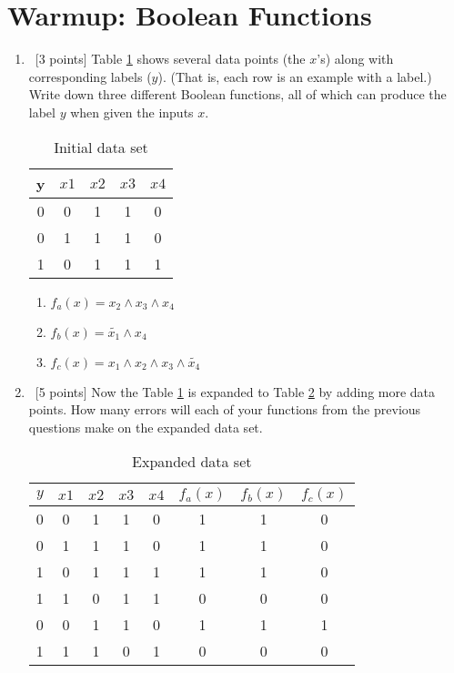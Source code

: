 \section{Warmup: Boolean Functions}
\label{sec:boolean-functions}

\begin{enumerate}
\item ~[3 points] Table \ref{tab:boolean-function-data-1} shows
  several data points (the $x$'s) along with corresponding labels
  ($y$). (That is, each row is an example with a label.) Write down
  three different Boolean functions, all of which can produce the
  label $y$ when given the inputs $x$.


  \begin{table}[h]
    \centering
    \begin{tabular}{|c|cccc|}
      \hline
      y & $x1$ & $x2$ & $x3$ & $x4$ \\
      \hline 
      0 & 0    & 1    & 1    & 0    \\
      0 & 1    & 1    & 1    & 0    \\
      1 & 0    & 1    & 1    & 1    \\
      \hline
    \end{tabular}
    \caption{Initial data set}
    \label{tab:boolean-function-data-1}
  \end{table}

  \begin{enumerate}
    \item $f_{a}(x) = x_{2} \wedge x_{3} \wedge x_{4}$
    \item $f_{b}(x) = \tilde{x_{1}} \wedge x_{4}$
    \item $f_{c}(x) = x_{1} \wedge x_{2} \wedge x_{3} \wedge \tilde{x_{4}}$
  \end{enumerate}
  
\item ~[5 points] Now the Table \ref{tab:boolean-function-data-1} is
  expanded to Table \ref{tab:boolean-function-data-2} by adding more
  data points. How many errors will each of your functions from the
  previous questions make on the expanded data set.

  \begin{table}[h]
    \centering
    \begin{tabular}{|c|cccc| ccc|}
      \hline
      $y$ & $x1$ & $x2$ & $x3$ & $x4$ & $f_{a}(x)$ & $f_{b}(x)$ & $f_{c}(x)$ \\
      \hline 
      0 & 0    & 1    & 1    & 0  &  1 & 1 & 0\\
      0 & 1    & 1    & 1    & 0  &  1 & 1 & 0\\
      1 & 0    & 1    & 1    & 1  &  1 & 1 & 0\\
      1 & 1    & 0    & 1    & 1  &  0 & 0 & 0\\
      0 & 0    & 1    & 1    & 0  &  1 & 1 & 1\\
      1 & 1    & 1    & 0    & 1  &  0 & 0 & 0\\
      \hline
    \end{tabular}
    \caption{Expanded data set}
    \label{tab:boolean-function-data-2}
  \end{table}
  

\end{enumerate}
